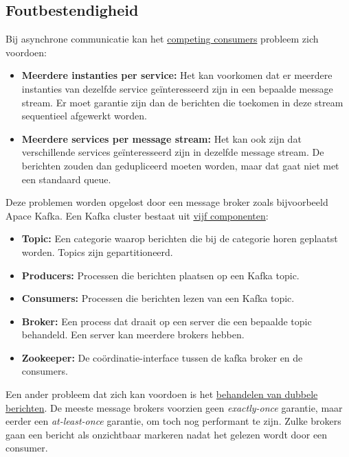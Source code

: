 	\subsection{Foutbestendigheid}
	Bij asynchrone communicatie kan het \uline{competing consumers} probleem zich voordoen:
	\begin{itemize}
		\item \textbf{Meerdere instanties per service:} Het kan voorkomen dat er meerdere instanties van dezelfde service geïnteresseerd zijn in een bepaalde message stream. Er moet garantie zijn dan de berichten die toekomen in deze stream sequentieel afgewerkt worden. 
		\item \textbf{Meerdere services per message stream:} Het kan ook zijn dat verschillende services geïnteresseerd zijn in dezelfde message stream. De berichten zouden dan gedupliceerd moeten worden, maar dat gaat niet met een standaard queue.
	\end{itemize}

	Deze problemen worden opgelost door een message broker zoals bijvoorbeeld Apace Kafka. Een Kafka cluster bestaat uit \uline{vijf componenten}:
	\begin{itemize}
		\item \textbf{Topic:} Een categorie waarop berichten die bij de categorie horen geplaatst worden. Topics zijn gepartitioneerd.
		\item \textbf{Producers:} Processen die berichten plaatsen op een Kafka topic.
		\item \textbf{Consumers:} Processen die berichten lezen van een Kafka topic.
		\item \textbf{Broker:} Een process dat draait op een server die een bepaalde topic behandeld. Een server kan meerdere brokers hebben.
		\item \textbf{Zookeeper:} De coördinatie-interface tussen de kafka broker en de consumers. 
		
	\end{itemize}

	Een ander probleem dat zich kan voordoen is het \uline{behandelen van dubbele berichten}. De meeste message brokers voorzien geen \emph{exactly-once} garantie, maar eerder een \emph{at-least-once} garantie, om toch nog performant te zijn. Zulke brokers gaan een bericht als onzichtbaar markeren nadat het gelezen wordt door een consumer.

